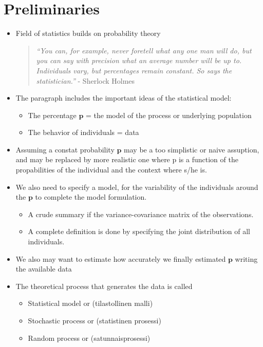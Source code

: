 \documentclass[10pt, twoside, a4paper]{book}
\theoremstyle{definition}
\begin{document}
\chapter{Preliminaries}
\begin{itemize}
  \item Field of statistics builds on probability theory
  \begin{quotation}
  \textit{``You can, for example, never foretell what any one man will do, but
  you can say with precision what an average number will be up to. Individuals vary,
  but percentages remain constant. So says the statistician.''} - Sherlock Holmes
  \end{quotation}
  \item The paragraph includes the important ideas of the statistical model:
  \begin{itemize}
    \item The percentage $\bm p$ = the model of the process or underlying
    population
    \item The behavior of individuals = data
  \end{itemize}
  \item Assuming a constat probability $\bm p$ may be a too simplistic or naive
  assuption, and may be replaced by more realistic one where p is a function of
  the propabilities of the individual and the context where s/he is.
  \item We also need to specify a model, for the variability of the
  individuals around the $\bm p$ to complete the model formulation.
  \begin{itemize}
    \item A crude summary if the variance-covariance matrix of the
    observations.
    \item A complete definition is done by specifying the joint distribution
    of all individuals.
  \end{itemize}
  \item We also may want to estimate how accurately we finally estimated $\bm p$
  writing the available data
  \item The theoretical process that generates the data is called
  \begin{itemize}
    \item Statistical model  or (tilastollinen malli)
    \item Stochastic process  or (statistinen prosessi)
    \item Random process or (satunnaisprosessi)
  \end{itemize}

\end{itemize}
\end{document}

